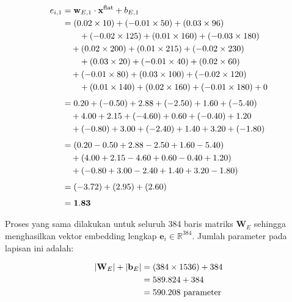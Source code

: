 \vspace{0.5cm}
\begin{align*}
  e_{i,1}
  &= \mathbf{w}_{E,1} \cdot \mathbf{x}^{\text{flat}} + b_{E,1}
  \notag \\
  &= (0.02\times10) + (-0.01\times50) + (0.03\times96) \notag \\
  &\qquad + (-0.02\times125) + (0.01\times160) + (-0.03\times180)
  \notag \\
  &\quad + (0.02\times200) + (0.01\times215) + (-0.02\times230) \notag \\
  &\qquad + (0.03\times20) + (-0.01\times40) + (0.02\times60)
  \notag \\
  &\quad + (-0.01\times80) + (0.03\times100) + (-0.02\times120) \notag \\
  &\qquad + (0.01\times140) + (0.02\times160) + (-0.01\times180) + 0
  \notag \\[4pt]
  &= 0.20 + (-0.50) + 2.88 + (-2.50) + 1.60 + (-5.40)
  \notag \\
  &\quad + 4.00 + 2.15 + (-4.60) + 0.60 + (-0.40) + 1.20
  \notag \\
  &\quad + (-0.80) + 3.00 + (-2.40) + 1.40 + 3.20 + (-1.80)
  \notag \\[4pt]
  &= (0.20 - 0.50 + 2.88 - 2.50 + 1.60 - 5.40)
  \notag \\
  &\quad + (4.00 + 2.15 - 4.60 + 0.60 - 0.40 + 1.20)
  \notag \\
  &\quad + (-0.80 + 3.00 - 2.40 + 1.40 + 3.20 - 1.80)
  \notag \\[4pt]
  &= (-3.72) + (2.95) + (2.60)
  \notag \\[4pt]
  &= \mathbf{1.83}
\end{align*}
\vspace{0.5cm}
 
\noindent
Proses yang sama dilakukan untuk seluruh 384 baris matriks
$\mathbf{W}_E$ sehingga menghasilkan vektor embedding lengkap
$\mathbf{e}_i \in \mathbb{R}^{384}$.
Jumlah parameter pada lapisan ini adalah:
 
\vspace{0.5cm}
\begin{align*}
  |\mathbf{W}_E| + |\mathbf{b}_E|
  &= (384 \times 1536) + 384 \notag \\
  &= 589.824 + 384 \notag \\
  &= 590{.}208 \text{ parameter}
\end{align*}
\vspace{0.5cm}
 
